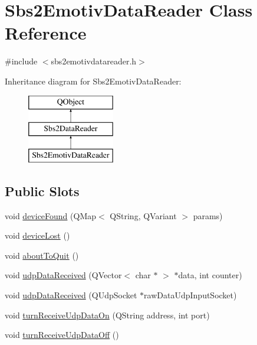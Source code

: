 \hypertarget{classSbs2EmotivDataReader}{\section{Sbs2\-Emotiv\-Data\-Reader Class Reference}
\label{classSbs2EmotivDataReader}
}


{\ttfamily \#include $<$sbs2emotivdatareader.\-h$>$}

Inheritance diagram for Sbs2\-Emotiv\-Data\-Reader\-:\begin{figure}[H]
\begin{center}
\leavevmode
\includegraphics[height=3.000000cm]{classSbs2EmotivDataReader}
\end{center}
\end{figure}
\subsection*{Public Slots}
\begin{DoxyCompactItemize}
\item 
void \hyperlink{classSbs2EmotivDataReader_af767aaebc3232c7690b139ec761e50d0}{device\-Found} (Q\-Map$<$ Q\-String, Q\-Variant $>$ params)
\item 
void \hyperlink{classSbs2EmotivDataReader_a59ce6dc2a270822ab978aaa0c59f1454}{device\-Lost} ()
\item 
void \hyperlink{classSbs2EmotivDataReader_a79159d8649d7d48624f008f5b4c7aa82}{about\-To\-Quit} ()
\item 
void \hyperlink{classSbs2EmotivDataReader_a9eeab9daa04dd01b414519107c286317}{udp\-Data\-Received} (Q\-Vector$<$ char $\ast$ $>$ $\ast$data, int counter)
\item 
void \hyperlink{classSbs2EmotivDataReader_a8da54f965e0c02555009bce9a136b664}{udp\-Data\-Received} (Q\-Udp\-Socket $\ast$raw\-Data\-Udp\-Input\-Socket)
\item 
void \hyperlink{classSbs2EmotivDataReader_a0872b3b86b715697086986b0b0a04dbe}{turn\-Receive\-Udp\-Data\-On} (Q\-String address, int port)
\item 
void \hyperlink{classSbs2EmotivDataReader_aeec17fa711c1497331dc5362468d5e63}{turn\-Receive\-Udp\-Data\-Off} ()
\end{DoxyCompactItemize}
